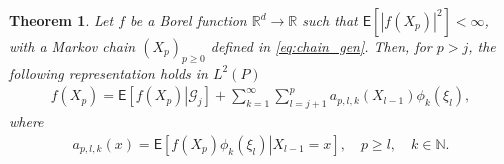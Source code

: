 \documentclass[preprint]{imsart}
\newtheorem{thm}{Theorem}
\begin{document}
\begin{thm}\label{prop:29032018a1}
 Let $f$ be a Borel function $\mathbb{R}^{d}\to\mathbb R$ such that
$\mathsf{E}\left[\left|f(X_{p})\right|^{2}\right]<\infty$, with a Markov chain $(X_{p})_{p\geq 0}$ defined in \eqref{eq:chain_gen}. 
Then,
for $p>j$, the following representation holds in \(L^2(P)\)
\begin{eqnarray}
\label{eq:mart_repr}
f(X_{p})=\mathsf{E}\left[\left.f(X_{p})\right|\mathcal G_{j}\right]+\sum_{k=1}^{\infty}\sum_{l=j+1}^{p}a_{p,l,k}(X_{l-1})\phi_k\left(\xi_{l}\right),
\end{eqnarray}
where
\begin{eqnarray}
\label{eq:coeff_mart}
a_{p,l,k}(x)=\mathsf{E}\left[\left.f(X_{p})\phi_k\left(\xi_{l}\right)\right|X_{l-1}=x\right], \quad p\geq l, \quad k\in \mathbb{N}.
\end{eqnarray}
\end{thm}
\end{document}
